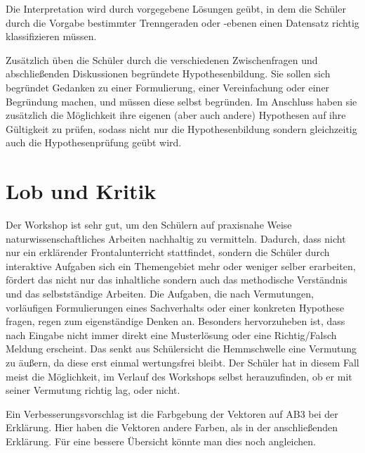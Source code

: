             Die Interpretation wird durch vorgegebene Lösungen geübt, in dem die Schüler durch die Vorgabe bestimmter Trenngeraden oder -ebenen einen Datensatz richtig klassifizieren müssen.\\
            \par
       Zusätzlich üben die Schüler durch die verschiedenen Zwischenfragen und abschließenden Diskussionen begründete Hypothesenbildung.
       Sie sollen sich begründet Gedanken zu einer Formulierung, einer Vereinfachung oder einer Begründung machen, und müssen diese selbst begründen. 
       Im Anschluss haben sie zusätzlich die Möglichkeit ihre eigenen (aber auch andere) Hypothesen auf ihre Gültigkeit zu prüfen, sodass nicht nur die Hypothesenbildung sondern gleichzeitig auch die Hypothesenprüfung geübt wird.

 \section{Lob und Kritik}
        Der Workshop ist sehr gut, um den Schülern auf praxisnahe Weise naturwissenschaftliches Arbeiten nachhaltig zu vermitteln.
        Dadurch, dass nicht nur ein erklärender Frontalunterricht stattfindet, sondern die Schüler durch interaktive Aufgaben sich ein Themengebiet mehr oder weniger selber erarbeiten, fördert das nicht nur das inhaltliche sondern auch das methodische Verständnis und das selbstständige Arbeiten.
        Die Aufgaben, die nach Vermutungen, vorläufigen Formulierungen eines Sachverhalts oder einer konkreten Hypothese fragen, regen zum eigenständige Denken an.
        Besonders hervorzuheben ist, dass nach Eingabe nicht immer direkt eine Musterlösung oder eine Richtig/Falsch Meldung erscheint. 
        Das senkt aus Schülersicht die Hemmschwelle eine Vermutung zu äußern, da diese erst einmal wertungsfrei bleibt. Der Schüler hat in diesem Fall meist die Möglichkeit, im Verlauf des Workshops selbst herauzufinden, ob er mit seiner Vermutung richtig lag, oder nicht.

        \par
        
        Ein Verbesserungsvorschlag ist die Farbgebung der Vektoren auf AB3 bei der Erklärung. Hier haben die Vektoren andere Farben, als in der anschließenden Erklärung. Für eine bessere Übersicht könnte man dies noch angleichen.


